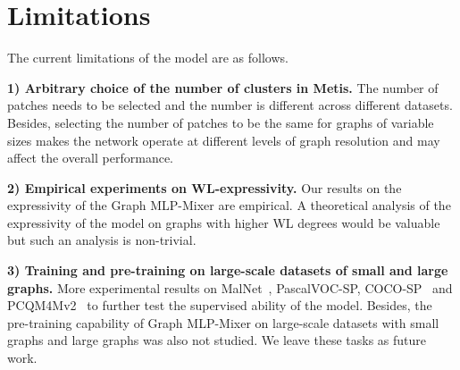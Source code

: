 \documentclass{article}
\begin{document}
\section{Limitations}\label{app sec: limitation}
The current limitations of the model are as follows.

\textbf{1) Arbitrary choice of the number of clusters in Metis.} The number of patches needs to be selected and the number is different across different datasets. Besides, selecting the number of patches to be the same for graphs of variable sizes makes the network operate at different levels of graph resolution and may affect the overall performance.

\textbf{2) Empirical experiments on WL-expressivity.} Our results on the expressivity of the Graph MLP-Mixer are empirical. A theoretical analysis of the expressivity of the model on graphs with higher WL degrees would be valuable but such an analysis is non-trivial.

\textbf{3) Training and pre-training on large-scale datasets of small and large graphs.} More experimental results on MalNet~\citep{freitas2020large_malnet}, PascalVOC-SP, COCO-SP~\citep{dwivedi2022long} and PCQM4Mv2~\citep{hu2020open} to further test the supervised ability of the model. Besides, the pre-training capability of Graph MLP-Mixer on large-scale datasets with small graphs and large graphs was also not studied. We leave these tasks as future work.
\end{document}
